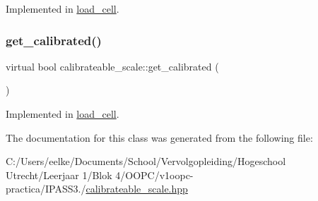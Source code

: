 Implemented in \hyperlink{classload__cell_a94e68480dead62fc20e4e92d0f8cc528}{load\+\_\+cell}.

\mbox{\label{classcalibrateable__scale_aaa5f41305d1777fffcf7dc63dce065e0}} 
\subsubsection{\texorpdfstring{get\+\_\+calibrated()}{get\_calibrated()}}
{\footnotesize\ttfamily virtual bool calibrateable\+\_\+scale\+::get\+\_\+calibrated (\begin{DoxyParamCaption}{ }\end{DoxyParamCaption})\hspace{0.3cm}{\ttfamily [pure virtual]}}



Implemented in \hyperlink{classload__cell_a54436b5bf8b57b404a51ab8289b7c4d7}{load\+\_\+cell}.



The documentation for this class was generated from the following file\+:\begin{DoxyCompactItemize}
\item 
C\+:/\+Users/eelke/\+Documents/\+School/\+Vervolgopleiding/\+Hogeschool Utrecht/\+Leerjaar 1/\+Blok 4/\+O\+O\+P\+C/v1oopc-\/practica/\+I\+P\+A\+S\+S3./\hyperlink{calibrateable__scale_8hpp}{calibrateable\+\_\+scale.\+hpp}\end{DoxyCompactItemize}
